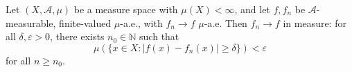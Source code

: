 Let $(X, \mathcal{A}, \mu)$ be a measure space with $\mu(X) < \infty$, and let $f, f_n$ be $\mathcal{A}$-measurable, finite-valued $\mu$-a.e., with $f_n \to f$ $\mu$-a.e. Then $f_n \to f$ in measure: for all $\delta, \varepsilon > 0$, there exists $n_0 \in \mathbb{N}$ such that
$$\mu(\{x \in X : |f(x) - f_n(x)| \geq \delta\}) < \varepsilon$$
for all $n \geq n_0$.